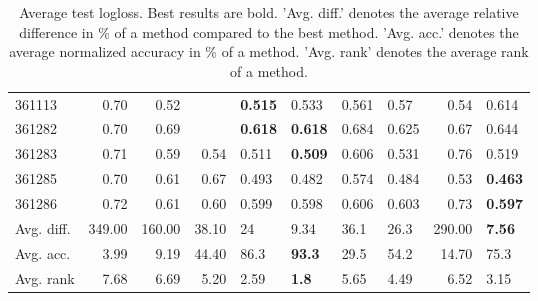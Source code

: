 \begin{table}[ht!]
\begin{tabular}{lrrrllllrl}
  361113 & 0.70 & 0.52 &  & \textbf{0.515} & 0.533 & 0.561 & 0.57 & 0.54 & 0.614 \\ 
  361282 & 0.70 & 0.69 &  & \textbf{0.618} & \textbf{0.618} & 0.684 & 0.625 & 0.67 & 0.644 \\ 
  361283 & 0.71 & 0.59 & 0.54 & 0.511 & \textbf{0.509} & 0.606 & 0.531 & 0.76 & 0.519 \\ 
  361285 & 0.70 & 0.61 & 0.67 & 0.493 & 0.482 & 0.574 & 0.484 & 0.53 & \textbf{0.463} \\ 
  361286 & 0.72 & 0.61 & 0.60 & 0.599 & 0.598 & 0.606 & 0.603 & 0.73 & \textbf{0.597} \\ 
   \hline
Avg. diff. & 349.00 & 160.00 & 38.10 & 24 & 9.34 & 36.1 & 26.3 & 290.00 & \textbf{7.56} \\ 
  Avg. acc. & 3.99 & 9.19 & 44.40 & 86.3 & \textbf{93.3} & 29.5 & 54.2 & 14.70 & 75.3 \\ 
  Avg. rank & 7.68 & 6.69 & 5.20 & 2.59 & \textbf{1.8} & 5.65 & 4.49 & 6.52 & 3.15 \\ 
   \hline
\hline
\end{tabular}
\endgroup
\caption{Average test logloss. 
                  Best results are bold. 
                  'Avg. diff.' denotes the average relative difference in \% of a method compared to the best method.
                  'Avg. acc.' denotes the average normalized accuracy in \% of a method.
                  'Avg. rank' denotes the average rank of a method.} 
\label{TABLES/table_results_logloss}
\end{table}
